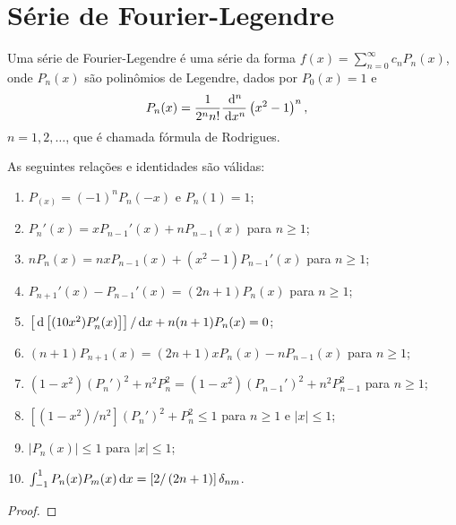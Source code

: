 \section{Série de Fourier-Legendre}
Uma série de Fourier-Legendre é uma série da forma $f(x) = \sum_{n = 0}^\infty c_n P_n(x)$, onde $P_n(x)$ são polinômios de Legendre, dados por $P_0(x) = 1$ e
\begin{align*}
    P_n(x) &= \frac{1}{2^n n!} \frac{\, \mathrm{d}^n}{\, \mathrm{d}x^n}\left( x^2 - 1 \right)^n,
\end{align*}
$n = 1, 2, \ldots$, que é chamada fórmula de Rodrigues.
\begin{prop}
    As seguintes relações e identidades são válidas:
    \begin{enumerate}
        \item $P_(x) = (-1)^n P_n(-x)$ e $P_n(1) = 1$;
        \item $P_n'(x) = x P_{n - 1}'(x) + n P_{n - 1}(x)$ para $n \geq 1$;
        \item $n P_n(x) = n x P_{n - 1}(x) + \left( x^2 - 1 \right) P_{n - 1}'(x)$ para $n \geq 1$;
        \item $P_{n + 1}'(x) - P_{n - 1}'(x) = \left( 2 n + 1 \right) P_n(x)$ para $n \geq 1$;
        \item $\left[ \, \mathrm{d}\left[ (1 0 x^2) P_n'(x) \right] \right] / \, \mathrm{d}x + n (n + 1) P_n(x) = 0$;
        \item $(n + 1) P_{n + 1}(x) = (2n + 1) x P_n(x) - n P_{n - 1}(x)$ para $n \geq 1$;
        \item $(1 - x^2) (P_n')^2 + n^2 P_n^2 = (1 - x^2) (P_{n - 1}')^2 + n^2 P_{n - 1}^2$ para $n \geq 1$;
        \item $\left[ (1 - x^2) / n^2 \right] (P_n')^2 + P_n^2 \leq 1$ para $n \geq 1$ e $|x| \leq 1$;
        \item $| P_n(x) | \leq 1$ para $|x| \leq 1$;
        \item $\int_{-1}^1 P_n(x) P_m(x) \, \mathrm{d}x = \left[ 2 / \left( 2 n + 1 \right) \right] \delta_{nm}$.
    \end{enumerate}
\end{prop}
\begin{proof}
\end{proof}
